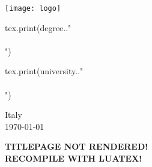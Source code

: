 \begin{titlepage}
\begin{center}
\vspace{1em}

\texttt{[image: logo]}

\vspace{1em}

\begin{luacode}
		tex.print(degree.."\\\\")
\end{luacode}
\begin{luacode}
		tex.print(university.."\\\\")
\end{luacode}
Italy \\
\today

\end{center}
\end{titlepage}
\else
\begin{titlepage}
\begin{center}
\textbf{\large{TITLEPAGE NOT RENDERED!\\RECOMPILE WITH LUATEX!}}
\end{center}
\end{titlepage}
\fi
